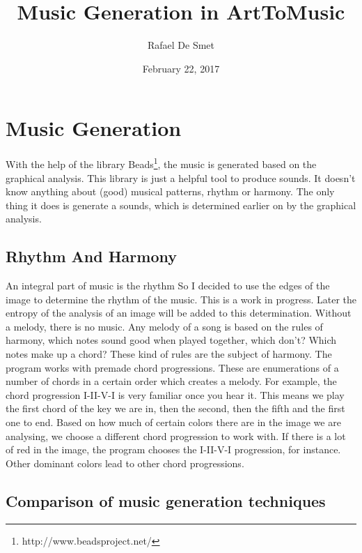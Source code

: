 \documentclass[12pt]{article}
\begin{document}
\title{Music Generation in ArtToMusic}
\date{February 22, 2017}
\author{Rafael De Smet}

\maketitle

\section{Music Generation}

With the help of the library Beads\footnote{http://www.beadsproject.net/}, the music is generated based on the graphical analysis. This library is just a helpful tool to produce sounds. It doesn't know anything about (good) musical patterns, rhythm or harmony. The only thing it does is generate a sounds, which is determined earlier on by the graphical analysis.

\subsection{Rhythm And Harmony}
An integral part of music is the rhythm So I decided to use the edges of the image to determine the rhythm of the music.
This is a work in progress. Later the entropy of the analysis of an image will be added to this determination.
\newline
\newline
Without a melody, there is no music. Any melody of a song is based on the rules of harmony, which notes sound good when played together, which don't? Which notes make up a chord? These kind of rules are the subject of harmony.
\newline
\newline
The program works with premade chord progressions. These are enumerations of a number of chords in a certain order which creates a melody. For example, the chord progression I-II-V-I is very familiar once you hear it. This means we play the first chord of the key we are in, then the second, then the fifth and the first one to end.
\newline
\newline
Based on how much of certain colors there are in the image we are analysing, we choose a different chord progression to work with. If there is a lot of red in the image, the program chooses the I-II-V-I progression, for instance. Other dominant colors lead to other chord progressions.

\subsection{Comparison of music generation techniques}
\end{document}
